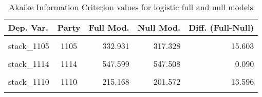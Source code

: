 \documentclass[
]{article}
\begin{document}
\begin{table}[!h]

\caption{\label{tab:unnamed-chunk-69}Akaike Information Criterion values for logistic full and null models 
        \label{table:logit_aic_fr}}
\centering
\begin{tabular}[t]{lcrrr}
\toprule
Dep. Var. & Party & Full Mod. & Null Mod. & Diff. (Full-Null)\\
\midrule
\cellcolor{gray!6}{stack\_1113} & \cellcolor{gray!6}{1113} & \cellcolor{gray!6}{404.384} & \cellcolor{gray!6}{454.071} & \cellcolor{gray!6}{-49.687}\\
stack\_1105 & 1105 & 332.931 & 317.328 & 15.603\\
\cellcolor{gray!6}{stack\_1111} & \cellcolor{gray!6}{1111} & \cellcolor{gray!6}{772.123} & \cellcolor{gray!6}{771.426} & \cellcolor{gray!6}{0.696}\\
stack\_1114 & 1114 & 547.599 & 547.508 & 0.090\\
\cellcolor{gray!6}{stack\_1101} & \cellcolor{gray!6}{1101} & \cellcolor{gray!6}{388.236} & \cellcolor{gray!6}{383.077} & \cellcolor{gray!6}{5.159}\\
\addlinespace
stack\_1110 & 1110 & 215.168 & 201.572 & 13.596\\
\cellcolor{gray!6}{stack\_1102} & \cellcolor{gray!6}{1102} & \cellcolor{gray!6}{710.954} & \cellcolor{gray!6}{774.865} & \cellcolor{gray!6}{-63.911}\\
\bottomrule
\end{tabular}
\end{table}
\end{document}
